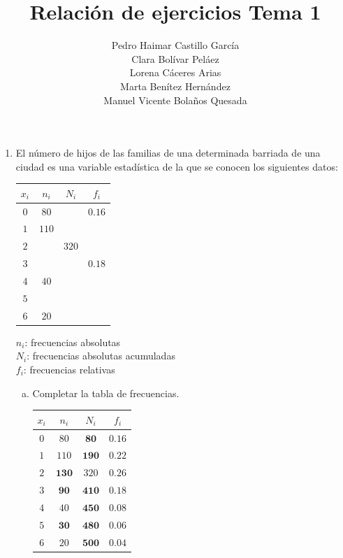 \documentclass[]{article}
\title{Relación de ejercicios Tema 1}
\author{Pedro Haimar Castillo García \\ Clara Bolívar Peláez \\ Lorena Cáceres Arias \\ Marta Benítez Hernández \\ Manuel Vicente Bolaños Quesada}
\date{}
\begin{document}
	\maketitle
	
	\begin{enumerate}[{Ejercicio} 1.]
		\item El número de hijos de las familias de una determinada barriada de una ciudad es una variable estadística de la que se conocen los siguientes datos:
		
		\begin{minipage}[t]{.45\linewidth}
			\raggedleft
			\vspace*{0pt}
			\begin{center}
			\begin{tabular}{| c | c | c | c |}
				\hline
				$x_i$ & $n_i$ & $N_i$ & $f_i$ \\
				\hline
				$0$ & $80$ & & $0.16$ \\
				$1$ & $110$ & &  \\
				$2$ &  & $320$ &  \\
				$3$ &  & & $0.18$ \\
				$4$ & $40$ & &  \\
				$5$ &  & &  \\
				$6$ & $20$ & &  \\
				\hline
			\end{tabular}
			\end{center}
		\end{minipage}%
		\begin{minipage}[t]{.45\linewidth}
			\vspace*{1 cm}
			\raggedright
			$n_i$: frecuencias absolutas \\
			$N_i$: frecuencias absolutas acumuladas \\
			$f_i$: frecuencias relativas
		\end{minipage}
	
		 \begin{enumerate}[a)]
		 	\item Completar la tabla de frecuencias.
		 	
		 	\begin{center}
		 		\begin{tabular}{| c | c | c | c |}
		 			\hline
		 			$x_i$ & $n_i$ & $N_i$ & $f_i$ \\
		 			\hline
		 			$0$ & $80$ & $\mathbf{80}$ & $0.16$ \\
		 			$1$ & $110$ & $\mathbf{190}$ & $\mathbf{0.22}$ \\
		 			$2$ & $\mathbf{130}$ & $320$ & $\mathbf{0.26}$ \\
		 			$3$ & $\mathbf{90}$ & $\mathbf{410}$ & $0.18$ \\
		 			$4$ & $40$ & $\mathbf{450}$ & $\mathbf{0.08}$ \\
		 			$5$ & $\mathbf{30}$ & $\mathbf{480}$ & $\mathbf{0.06}$ \\
		 			$6$ & $20$ & $\mathbf{500}$ & $\mathbf{0.04}$ \\
		 			\hline
		 		\end{tabular}
		 	\end{center}
	 		

\end{enumerate}
\end{enumerate}
\end{document}
